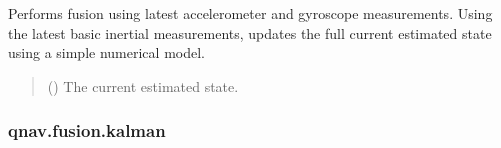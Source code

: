 \documentclass[letterpaper,10pt,english]{sphinxmanual}
\begin{document}
\begin{fulllineitems}
\begin{fulllineitems}
\label{\detokenize{modules/fusion/ins:qnav.fusion.ins.AdamsBashforth.perform_fusion}}
\pysigstartsignatures
{}
\pysigstopsignatures
\sphinxAtStartPar
Performs fusion using latest accelerometer and gyroscope measurements.
Using the latest basic inertial measurements, updates the full current
estimated state using a simple numerical model.
\begin{quote}\begin{description}
\sphinxAtStartPar
{} ({\hyperref[\detokenize{modules/estimation/state:qnav.estimation.state.EstimatedState}]{}}) \textendash{} The current estimated state.

\end{description}\end{quote}

\end{fulllineitems}


\end{fulllineitems}


\sphinxstepscope


\subsubsection{qnav.fusion.kalman}
\label{\detokenize{modules/fusion/kalman:module-qnav.fusion.kalman}}\label{\detokenize{modules/fusion/kalman:qnav-fusion-kalman}}\label{\detokenize{modules/fusion/kalman::doc}}
\end{document}

